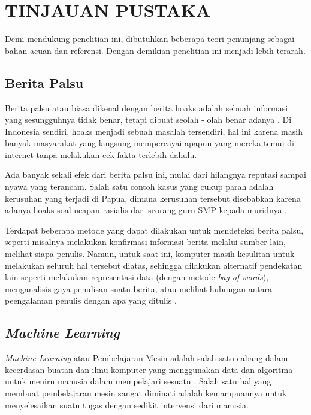 \chapter{TINJAUAN PUSTAKA}
\label{chap:tinjauanpustaka}

Demi mendukung penelitian ini, dibutuhkan beberapa teori penunjang sebagai bahan acuan dan referensi. Dengan demikian penelitian ini menjadi lebih terarah.

\section{Berita Palsu}
\label{sec:beritapalsu}

Berita palsu atau biasa dikenal dengan berita hoaks adalah sebuah informasi yang sesungguhnya tidak benar, tetapi dibuat seolah - olah benar adanya \cite{berita_bohong}. Di Indonesia sendiri, hoaks menjadi sebuah masalah tersendiri, hal ini karena masih banyak masyarakat yang langsung mempercayai apapun yang mereka temui di internet tanpa melakukan cek fakta terlebih dahulu.

Ada banyak sekali efek dari berita palsu ini, mulai dari hilangnya reputasi sampai nyawa yang terancam. Salah satu contoh kasus yang cukup parah adalah kerusuhan yang terjadi di Papua, dimana kerusuhan tersebut disebabkan karena adanya hoaks soal ucapan rasialis dari seorang guru SMP kepada muridnya \cite{efek_hoax}.

Terdapat beberapa metode yang dapat dilakukan untuk mendeteksi berita palsu, seperti misalnya melakukan konfirmasi informasi berita melalui sumber lain, melihat siapa penulis. Namun, untuk saat ini, komputer masih kesulitan untuk melakukan seluruh hal tersebut diatas, sehingga dilakukan alternatif pendekatan lain seperti melakukan representasi data (dengan metode \textit{bag-of-words}), menganalisis gaya penulisan suatu berita, atau melihat hubungan antara peengalaman penulis dengan apa yang ditulis \cite{fake_news_detection_method}.

\section{\textit{Machine Learning}}

\textit{Machine Learning} atau Pembelajaran Mesin adalah salah satu cabang dalam kecerdasan buatan dan ilmu komputer yang menggunakan data dan algoritma untuk meniru manusia dalam mempelajari sesuatu \cite{ibm_ml_expl}. Salah satu hal yang membuat pembelajaran mesin sangat diminati adalah kemampuannya untuk menyelesaikan suatu tugas dengan sedikit intervensi dari manusia.

